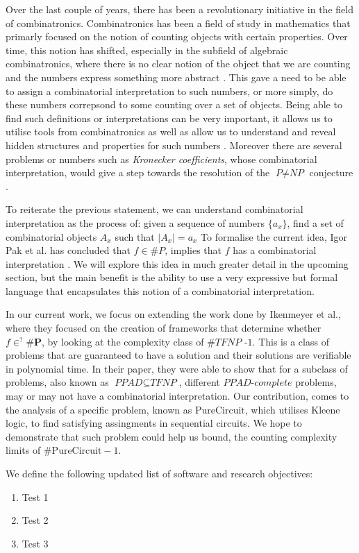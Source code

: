 Over the last couple of years, there has been a revolutionary
initiative in the field of combinatronics.
Combinatronics has been a field of study in mathematics that primarly focused on
the notion of counting objects with certain properties. Over time, this notion
has shifted, especially in the subfield of algebraic combinatronics, where
there is no clear notion of the object that we are counting
and the numbers express something more abstract \cite{pakWhatCombinatorialInterpretation2022}. %
This gave a need to be able to assign a combinatorial interpretation to such numbers, or
more simply, do these numbers correpsond to some counting over a set of objects.
Being able to find such definitions or interpretations can be very important,
it allows us to utilise tools from combinatronics as well as allow us to understand
and reveal hidden structures and properties for such numbers \cite{pakWhatCombinatorialInterpretation2022}. 
Moreover there are several problems or numbers such as \textit{Kronecker coefficients},
whose combinatorial interpretation, would give a step towards the resolution of the $\textit{P} \neq \textit{NP}$
conjecture \cite{ikenmeyerWhatWhatNot2022a}.


To reiterate the previous statement, we can understand combinatorial interpretation as
the process of: given a sequence of numbers $\{a_x\}$,
find a set of combinatorial objects $A_x$ such that $|A_x| = a_x$
To formalise the current idea, Igor Pak et al. has concluded that
$f \in \textit{\#P}$, implies that $f$ has a combinatorial interpretation
\cite{pakWhatCombinatorialInterpretation2022, ikenmeyerWhatWhatNot2022a}.
We will explore this idea in much greater detail in the upcoming section,
but the main benefit is the ability to use a very expressive but formal language
that encapsulates this notion of a combinatorial interpretation.


In our current work, we focus on extending the work done by
Ikenmeyer et al., where they focused on the creation of frameworks
that determine whether $f \in^? \textbf{\#P}$, by looking
at the complexity class of $\textbf{\#}\textit{TFNP -1}$.
This is a class of problems that are guaranteed to have a solution
and their solutions are verifiable in polynomial time.
In their paper, they were able to show that for a subclass of
problems, also known as $\textit{PPAD} \subseteq \textit{TFNP}$,
different $\textit{PPAD-complete}$ problems, may or may not have a combinatorial
interpretation. Our contribution, comes to the analysis of a specific
problem, known as $\text{PureCircuit}$, which utilises
Kleene logic, to find satisfying assingments in sequential circuits.
We hope to demonstrate that such problem could help us bound, the
counting complexity limits of $\textbf{\#}\text{PureCircuit} -1$.


We define the following updated list of software and research objectives:

\begin{enumerate}[label=R\arabic*]
    \item Test 1 
    \item Test 2
    \item Test 3 
\end{enumerate}
